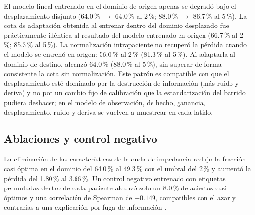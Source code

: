 \documentclass[11pt,a4paper]{article}
\begin{document}
El modelo lineal entrenado en el dominio de origen apenas se degradó bajo el
desplazamiento disjunto (64.0\,\% $\rightarrow$ 64.0\,\% al 2\,\%; 88.0\,\%
$\rightarrow$ 86.7\,\% al 5\,\%). La cota de adaptación obtenida al entrenar
dentro del dominio desplazado fue prácticamente idéntica al resultado del modelo
entrenado en origen (66.7\,\% al 2\,\%; 85.3\,\% al 5\,\%). La normalización
intrapaciente no recuperó la pérdida cuando el modelo se entrenó en origen:
56.0\,\% al 2\,\% (81.3\,\% al 5\,\%). Al adaptarla al dominio de destino,
alcanzó 64.0\,\% (88.0\,\% al 5\,\%), sin superar de forma consistente la cota
sin normalización. Este patrón es compatible con que el desplazamiento esté
dominado por la destrucción de información (más ruido y deriva) y no por un
cambio fijo de calibración que la estandarización del barrido pudiera deshacer;
en el modelo de observación, de hecho, ganancia, desplazamiento, ruido y deriva
se vuelven a muestrear en cada latido.

\begin{table}[htbp]
\centering
\small
\caption{Protocolo de dominio desplazado sellado y cota de adaptación. Las dos
últimas filas usan normalización intrapaciente y son análisis de sensibilidad.}
\label{tab:shift}
\end{table}

\subsection{Ablaciones y control negativo}

La eliminación de las características de la onda de impedancia redujo la fracción
casi óptima en el dominio del 64.0\,\% al 49.3\,\% con el umbral del 2\,\% y
aumentó la pérdida del 1.80\,\% al 3.66\,\%. Un control negativo entrenado con
etiquetas permutadas dentro de cada paciente alcanzó solo un 8.0\,\% de aciertos
casi óptimos y una correlación de Spearman de $-0.149$, compatibles con el azar y
contrarias a una explicación por fuga de información \citep{kapoor2023}.
\end{document}

